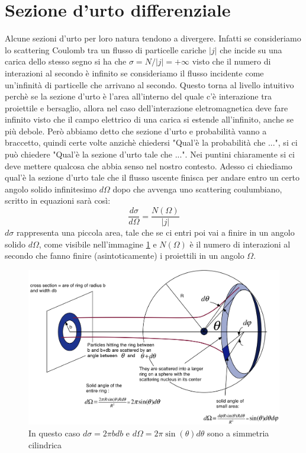 \documentclass[11pt,a4paper]{article}
\begin{document}
	\section{Sezione d'urto differenziale}
		Alcune sezioni d'urto per loro natura tendono a divergere. Infatti se consideriamo lo scattering Coulomb tra un flusso di particelle cariche $|j|$ che incide su una carica dello stesso segno si ha che $\sigma=N/|j|=+\infty$ visto che il numero di interazioni al secondo è infinito se consideriamo il flusso incidente come un'infinità di particelle che arrivano al secondo.\newline
		Questo torna al livello intuitivo perchè se la sezione d'urto è l'area all'interno del quale c'è interazione tra proiettile e bersaglio, allora nel caso dell'interazione eletromagnetica deve fare infinito visto che il campo elettrico di una carica si estende all'infinito, anche se più debole.\newline
		Però abbiamo detto che sezione d'urto e probabilità vanno a braccetto, quindi certe volte anzichè chiedersi "Qual'è la probabilità che ...", si ci può chiedere "Qual'è la sezione d'urto tale che ...". Nei puntini chiaramente si ci deve mettere qualcosa che abbia senso nel nostro contesto.\newline
		Adesso ci chiediamo qual'è la sezione d'urto tale che il flusso uscente finisca per andare entro un certo angolo solido infinitesimo $d\Omega$ dopo che avvenga uno scattering coulumbiano, scritto in equazioni sarà così:
		\begin{equation}
			\frac{d\sigma}{d\Omega}=\frac{N(\Omega)}{|j|}
			\label{eq:sez_diff}
		\end{equation}
		$d\sigma$ rappresenta una piccola area, tale che se ci entri poi vai a finire in un angolo solido $d\Omega$, come visibile nell'immagine \ref{fig:rut1} e $N(\Omega)$ è il numero di interazioni al secondo che fanno finire (asintoticamente) i proiettili in un angolo $\Omega$.\newline
		\begin{figure}
			\centering
    		\includegraphics[width=\linewidth]{Immagini/solid_angle.png}
    		\caption{In questo caso $d\sigma=2\pi b db$ e $d\Omega=2\pi \sin(\theta)d\theta$ sono a simmetria cilindrica}
    		\label{fig:rut1}
		\end{figure}
\end{document}
